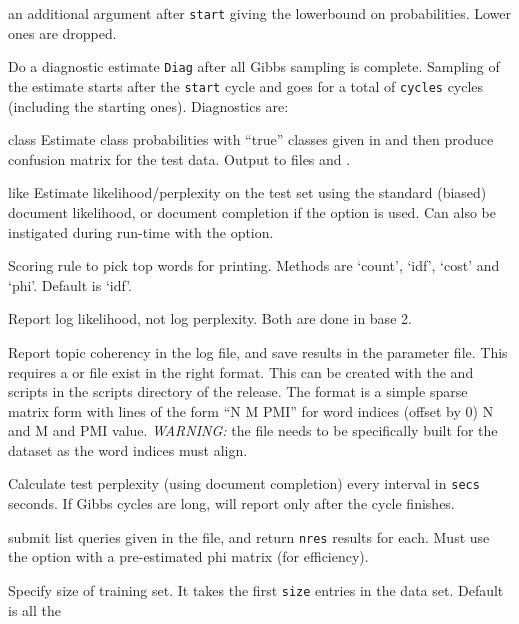\documentclass[a4paper,english]{article}
\begin{document}
\begin{Description}
an additional argument after \texttt{start} giving the lowerbound
on probabilities.  Lower ones are dropped.
\item[\OptArg{-L}{Diag,cycles,start}] 
Do a diagnostic estimate \texttt{Diag} after
all Gibbs sampling is complete.
Sampling of the estimate starts after the \texttt{start} cycle 
and goes for a total of \texttt{cycles} cycles
(including the starting ones).
Diagnostics are:
\begin{Description}[class]\setlength{\itemsep}{0cm}
\item[class] 
Estimate class probabilities with ``true'' classes
given in  and then
produce confusion matrix for the test data.
Output to files
 and .
\item[like] 
Estimate likelihood/perplexity on the test set
using the standard (biased) document likelihood,
or document completion if the 
option is used.
Can also be instigated during run-time with the
 option.
\end{Description}
\item[\OptArg{-o}{score}]  Scoring rule to pick top words for printing.
Methods are `count', `idf', `cost' and `phi'.  Default is `idf'.
\item[\Opt{-O}] Report log likelihood, not log perplexity.  Both
are done in base 2.
\item[\Opt{-p}] Report topic coherency in the log file, and 
save results in the parameter file.  This requires 
a  or  file exist
in the right format.  This can be created with the 
 and
 scripts in the scripts directory of the release.
The format is a simple sparse matrix form with lines
of the form ``N M PMI'' for word indices
(offset by 0) N and M and PMI value.
\emph{WARNING:}  the file  needs to be specifically built for 
the dataset as the word indices must align.
\item[\OptArg{-P}{secs}]  
Calculate test perplexity (using document completion)
every interval in \texttt{secs} seconds.  If Gibbs cycles are long,
will report only after the cycle finishes.
\item[\OptArg{-Q}{nres,file}]  
submit list queries given in the file, and return \texttt{nres}
results for each.  Must use the  option with
a pre-estimated phi matrix (for efficiency).
\item[\OptArg{-t}{size}]  Specify size of training set.  It takes the
first \texttt{size} entries in the data set. Default is all the

\end{Description}
\end{document}

